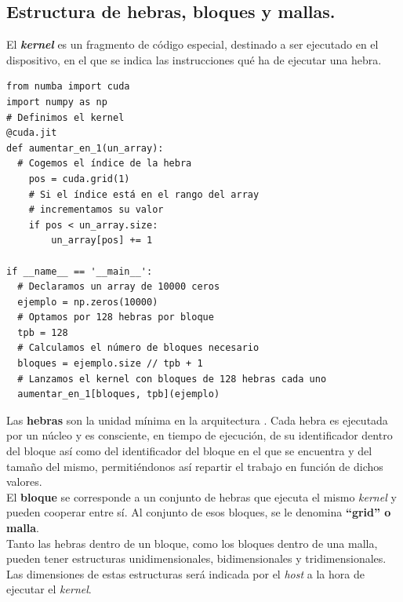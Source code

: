 \subsection{Estructura de hebras, bloques y mallas.}
El \textbf{\textit{kernel}} es un fragmento de código especial, destinado a ser ejecutado en el dispositivo, en el que se indica las instrucciones qué ha de ejecutar una hebra.\\
\begin{code}
\begin{verbatim}
from numba import cuda
import numpy as np
# Definimos el kernel
@cuda.jit
def aumentar_en_1(un_array):
  # Cogemos el índice de la hebra
    pos = cuda.grid(1)
    # Si el índice está en el rango del array
    # incrementamos su valor
    if pos < un_array.size:
        un_array[pos] += 1

if __name__ == '__main__':
  # Declaramos un array de 10000 ceros
  ejemplo = np.zeros(10000)
  # Optamos por 128 hebras por bloque
  tpb = 128
  # Calculamos el número de bloques necesario
  bloques = ejemplo.size // tpb + 1
  # Lanzamos el kernel con bloques de 128 hebras cada uno
  aumentar_en_1[bloques, tpb](ejemplo)
\end{verbatim}
\label{code:numbaexample}
\end{code}

Las \textbf{hebras} son la unidad mínima en la arquitectura \cudanospace. Cada hebra es ejecutada por un núcleo \cuda y es consciente, en tiempo de ejecución, de su identificador dentro del bloque así como del identificador del bloque en el que se encuentra y del tamaño del mismo, permitiéndonos así repartir el trabajo en función de dichos valores.\\

El \textbf{bloque} se corresponde a un conjunto de hebras que ejecuta el mismo \textit{kernel} y pueden cooperar entre sí. Al conjunto de esos bloques, se le denomina \textbf{``grid'' o malla}. \\

Tanto las hebras dentro de un bloque, como los bloques dentro de una malla, pueden tener estructuras unidimensionales, bidimensionales y tridimensionales. Las dimensiones de estas estructuras será indicada por el \textit{host} a la hora de ejecutar el \textit{kernel}.\\

